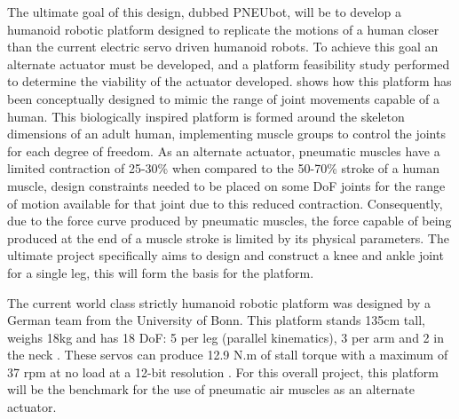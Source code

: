 \documentclass[11pt,a4paper]{article}
\begin{document}
The ultimate goal of this design, dubbed PNEUbot, will be to develop a humanoid robotic platform designed to replicate the motions of a human closer than the current electric servo driven humanoid robots. To achieve this goal an alternate actuator must be developed, and a platform feasibility study performed to determine the viability of the actuator developed.  shows how this platform has been conceptually designed to mimic the range of joint movements capable of a human. This biologically inspired platform is formed around the skeleton dimensions of an adult human, implementing muscle groups to control the joints for each degree of freedom. As an alternate actuator, pneumatic muscles have a limited contraction of 25-30\% when compared to the 50-70\% stroke of a human muscle, design constraints needed to be placed on some DoF joints for the range of motion available for that joint due to this reduced contraction. Consequently, due to the force curve produced by pneumatic muscles, the force capable of being produced at the end of a muscle stroke is limited by its physical parameters. The ultimate project specifically aims to design and construct a knee and ankle joint for a single leg, this will form the basis for the platform.\newline

The current world class strictly humanoid robotic platform was designed by a German team from the University of Bonn. This platform stands 135cm tall, weighs 18kg and has 18 DoF: 5 per leg (parallel kinematics), 3 per arm and 2 in the neck \cite{ficht_farazi_brandenburger_rodriguez_pavlichenko_allgeuer_hosseini_behnke_2018}. These servos can produce 12.9 N.m of stall torque with a maximum of 37 rpm at no load at a 12-bit resolution \cite{robotis}. For this overall project, this platform will be the benchmark for the use of pneumatic air muscles as an alternate actuator. \newline
\end{document}
